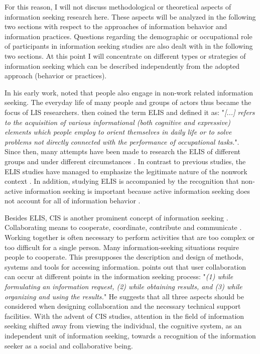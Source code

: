 \documentclass[12pt, a4paper, titlepage, oneside, abstract=true, toc=listof, toc=bibliography, BCOR=1cm]{scrreprt}
\begin{document}
For this reason, I will not discuss methodological or theoretical aspects of information seeking research here. These aspects will be analyzed in the following two sections with respect to the approaches of information behavior and information practices. Questions regarding the demographic or occupational role of participants in information seeking studies are also dealt with in the following two sections. At this point I will concentrate on different types or strategies of information seeking which can be described independently from the adopted approach (behavior or practices). 

In his early work, \citet{Wilson1977} noted that people also engage in non-work related information seeking. The everyday life of many people and groups of actors thus became the focus of \gls{LIS} researchers.   \citet{Savolainen1995} then coined the term \gls{ELIS} and defined it as: "\textit{[...] refers to the acquisition of various informational (both cognitive and expressive) elements which people employ to orient themselves in daily life or to solve problems not directly connected with the performance of occupational tasks.}". Since then, many attempts have been made to research the ELIS of different groups and under different circumstances \citep[e.g.][]{Agosto2005, Fisher2006a, Loudon2016, Kim2016, McKenzie2003a}. In contrast to previous studies, the ELIS studies have managed to emphasize the legitimate nature of the nonwork context \citep[p. 266]{Savolainen1995}. In addition, studying ELIS is accompanied by the recognition that non-active information seeking is important because active information seeking does not account for all of information behavior \citep[p. 21]{McKenzie2003a}. 

Besides ELIS, \gls{CIS} is another prominent concept of information seeking \citep[e.g.][]{Boehm2014, Hansen2016, Hertzum2008, Hertzum2019, Shah2010, Shah2013}. Collaborating means to cooperate, coordinate, contribute and communicate \citep[p. 6]{Shah2010}. Working together is often necessary to perform activities that are too complex or too difficult for a single person. Many information-seeking situations require people to cooperate. This presupposes the description and design of methods, systems and tools for accessing information. \citet[p. 26]{Shah2010} points out that user collaboration can occur at different points in the information seeking process: "\textit{(1) while formulating an information request, (2) while obtaining results, and (3) while organizing and using the results.}" He suggests that all three aspects should be considered when designing collaboration and the necessary technical support facilities. With the advent of CIS studies, attention in the field of information seeking shifted away from viewing the individual, the cognitive system, as an independent unit of information seeking, towards a recognition of the information seeker as a social and collaborative being.
\end{document}
